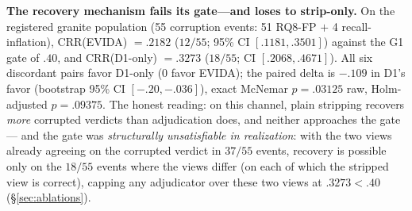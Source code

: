 \documentclass[sigconf,nonacm]{acmart}
\begin{document}
\textbf{The recovery mechanism fails its gate---and loses to strip-only.}
On the registered granite population (55 corruption events: 51 RQ8-FP $+$
4 recall-inflation), CRR(EVIDA) $=.2182$ ($12/55$; 95\% CI
$[.1181,.3501]$) against the G1 gate of $.40$, and CRR(D1-only) $=.3273$
($18/55$; CI $[.2068,.4671]$). All six discordant pairs favor D1-only
(0 favor EVIDA); the paired delta is $-.109$ in D1's favor (bootstrap
95\% CI $[-.20,-.036]$), exact McNemar $p{=}.03125$ raw,
Holm-adjusted $p{=}.09375$. The honest reading: on this channel, plain
stripping recovers \emph{more} corrupted verdicts than adjudication does,
and neither approaches the gate --- and the gate was \emph{structurally
unsatisfiable in realization}: with the two views already agreeing on the
corrupted verdict in $37/55$ events, recovery is possible only on the
$18/55$ events where the views differ (on each of which the stripped view
is correct), capping any adjudicator over these two views at
$.3273 < .40$ (\S\ref{sec:ablations}).
\end{document}
